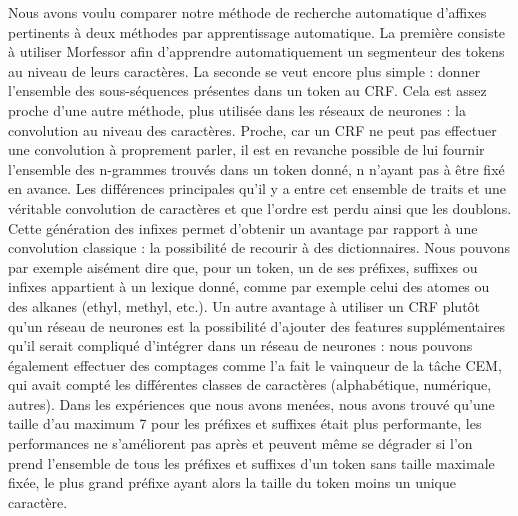 \documentclass[PhD-Yoann-Dupont.tex]{subfiles}
\begin{document}



Nous avons voulu comparer notre méthode de recherche automatique d'affixes pertinents à deux méthodes par apprentissage automatique. La première consiste à utiliser Morfessor afin d'apprendre automatiquement un segmenteur des tokens au niveau de leurs caractères. La seconde se veut encore plus simple : donner l'ensemble des sous-séquences présentes dans un token au CRF. Cela est assez proche d'une autre méthode, plus utilisée dans les réseaux de neurones : la convolution au niveau des caractères. Proche, car un CRF ne peut pas effectuer une convolution à proprement parler, il est en revanche possible de lui fournir l'ensemble des n-grammes trouvés dans un token donné, n n'ayant pas à être fixé en avance. Les différences principales qu'il y a entre cet ensemble de traits et une véritable convolution de caractères et que l'ordre est perdu ainsi que les doublons. Cette génération des infixes permet d'obtenir un avantage par rapport à une convolution classique : la possibilité de recourir à des dictionnaires. Nous pouvons par exemple aisément dire que, pour un token, un de ses préfixes, suffixes ou infixes appartient à un lexique donné, comme par exemple celui des atomes ou des alkanes (ethyl, methyl, etc.). Un autre avantage à utiliser un CRF plutôt qu'un réseau de neurones est la possibilité d'ajouter des features supplémentaires qu'il serait compliqué d'intégrer dans un réseau de neurones : nous pouvons également effectuer des comptages comme l'a fait le vainqueur de la tâche CEM, qui avait compté les différentes classes de caractères (alphabétique, numérique, autres). Dans les expériences que nous avons menées, nous avons trouvé qu'une taille d'au maximum 7 pour les préfixes et suffixes était plus performante, les performances ne s'améliorent pas après et peuvent même se dégrader si l'on prend l'ensemble de tous les préfixes et suffixes d'un token sans taille maximale fixée, le plus grand préfixe ayant alors la taille du token moins un unique caractère.
\end{document}
